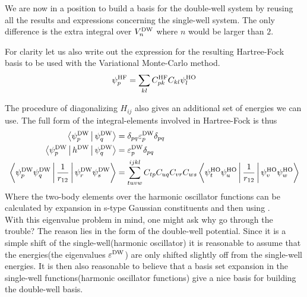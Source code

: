     We are now in a position to build a basis for the double-well system by
    reusing all the results and expressions concerning the single-well system.
    The only difference is the extra integral over $\VDW_n$ where $n$ would be
    larger than $2$.

    For clarity let us also write out the expression for the resulting
    Hartree-Fock basis to be used with the Variational Monte-Carlo method.
        \begin{equation}
            \psi^{\text{HF}}_p = \sumll{kl} C^{\text{HF}}_{pk}C_{kl}\psiHO_l
        \end{equation}

    The procedure of diagonalizing $H_{ij}$ also gives an additional set of
    energies we can use. The full form of the integral-elements involved in
    Hartree-Fock is thus
        \begin{equation}
            \begin{aligned}
                \Braket{\psiDW_p|\psiDW_q} &= \delta_{pq}
                \varepsilon^{\text{DW}}_p\delta_{pq} \\
                \Braket{\psiDW_p|h^{\text{DW}}|\psiDW_q} &=
                \varepsilon^{\text{DW}}_p\delta_{pq} \\
                \Braket{\psiDW_p\psiDW_q|\frac{1}{r_{12}}|\psiDW_r\psiDW_s} &=
                \suml{tuvw}{ijkl} C_{tp}C_{uq}C_{vr}C_{ws}
                \Braket{\psiHO_t\psiHO_u|\frac{1}{r_{12}}|\psiHO_v\psiHO_w}
            \end{aligned}
        \end{equation}
    Where the two-body elements over the harmonic oscillator functions can be
    calculated by expansion in s-type Gaussian constituents and then using
    . \\

    With this eigenvalue problem in mind, one might ask why go through the
    trouble? The reason lies in the form of the double-well potential. Since it
    is a simple shift of the single-well(harmonic oscillator) it is reasonable
    to assume that the energies(the eigenvalues $\veps^{\text{DW}}$) are only
    shifted slightly off from the single-well energies. It is then also
    reasonable to believe that a basis set expansion in the single-well
    functions(harmonic oscillator functions) give a nice basis for building the
    double-well basis.

